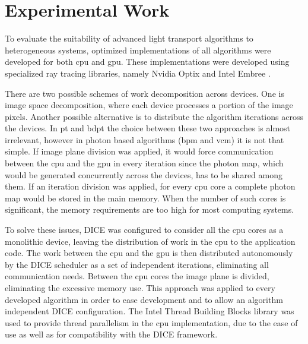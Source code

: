\chapter{Experimental Work}


To evaluate the suitability of advanced light transport algorithms to heterogeneous systems, optimized implementations of all algorithms were developed for both \gls{cpu} and \gls{gpu}. These implementations were developed using specialized ray tracing libraries, namely Nvidia Optix \citep{parker2010optix} and Intel Embree \citep{wald2014embree}.


There are two possible schemes of work decomposition across devices. One is image space decomposition, where each device processes a portion of the image pixels. Another possible alternative is to distribute the algorithm iterations across the devices. In \gls{pt} and \gls{bdpt} the choice between these two approaches is almost irrelevant, however in photon based algorithms (\gls{bpm} and \gls{vcm}) it is not that simple. If image plane division was applied, it would force communication between the \gls{cpu} and the \gls{gpu} in every iteration since the photon map, which would be generated concurrently across the devices, has to be shared among them. If an iteration division was applied, for every \gls{cpu} core a complete photon map would be stored in the main memory. When the number of such cores is significant, the memory requirements are too high for most computing systems.

To solve these issues, DICE was configured to consider all the \gls{cpu} cores as a monolithic device, leaving the distribution of work in the \gls{cpu} to the application code. The work between the \gls{cpu} and the \gls{gpu} is then distributed autonomously by the DICE scheduler as a set of independent iterations, eliminating all communication needs. Between the \gls{cpu} cores the image plane is divided, eliminating the excessive memory use. This approach was applied to every developed algorithm in order to ease development and to allow an algorithm independent DICE configuration. The Intel Thread Building Blocks library was used to provide thread parallelism in the \gls{cpu} implementation, due to the ease of use as well as for compatibility with the DICE framework.

